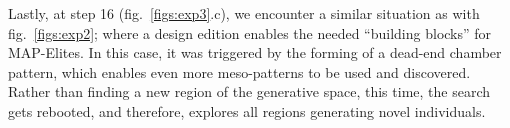 Lastly, at step 16 (fig.~\ref{figs:exp3}.c), we encounter a similar situation as with fig.~\ref{figs:exp2};  where a design edition enables the needed “building blocks” for MAP-Elites. In this case, it was triggered by the forming of a dead-end chamber pattern, which enables even more meso-patterns to be used and discovered. Rather than finding a new region of the generative space, this time, the search gets rebooted, and therefore, explores all regions generating novel individuals.





